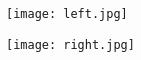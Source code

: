 
\begin{flushright}
\texttt{[image: left.jpg]}
\end{flushright}


\clearpage
\begin{flushleft}
\texttt{[image: right.jpg]}
\end{flushleft}

\clearpage
